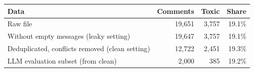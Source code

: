 \begin{tabular}{lrrr}
\toprule
Data & Comments & Toxic & Share \\
\midrule
Raw file & 19,651 & 3,757 & 19.1\% \\
Without empty messages (leaky setting) & 19,647 & 3,757 & 19.1\% \\
Deduplicated, conflicts removed (clean setting) & 12,722 & 2,451 & 19.3\% \\
LLM evaluation subset (from clean) & 2,000 & 385 & 19.2\% \\
\bottomrule
\end{tabular}
